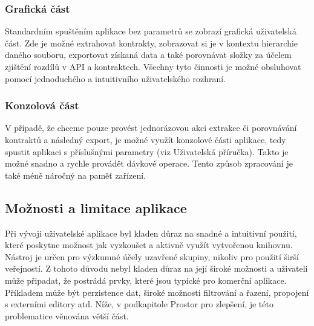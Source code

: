 	   		\subsubsection{Grafická část}
	   			Standardním spuštěním aplikace bez parametrů se zobrazí grafická uživatelská část. Zde je možné extrahovat kontrakty, zobrazovat si je v kontextu hierarchie daného souboru, exportovat získaná data a také porovnávat složky za účelem zjištění rozdílů v API a kontraktech. Všechny tyto činnosti je možné obsluhovat pomocí jednoduchého a intuitivního uživatelského rozhraní.			   			  		
	   		\subsubsection{Konzolová část}
	   			V případě, že chceme pouze provést jednorázovou akci extrakce či porovnávání kontraktů a následný export, je možné využít konzolové části aplikace, tedy spustit aplikaci s příslušnými parametry (viz Uživatelská příručka). Takto je možné snadno a rychle provádět dávkové operace. Tento způsob zpracování je také méně náročný na paměť zařízení.
	   
	   \subsection{Možnosti a limitace aplikace}
	   		Při vývoji uživatelské aplikace byl kladen důraz na snadné a intuitivní použití, které poskytne možnost jak vyzkoušet a aktivně využít vytvořenou knihovnu. Nástroj je určen pro výzkumné účely uzavřené skupiny, nikoliv pro použití širší veřejností. Z tohoto důvodu nebyl kladen důraz na její široké možnosti a uživateli může připadat, že postrádá prvky, které jsou typické pro komerční aplikace. Příkladem může být perzistence dat, široké možnosti filtrování a řazení, propojení s externími editory atd. Níže, v podkapitole Prostor pro zlepšení, je této problematice věnována větší část.




